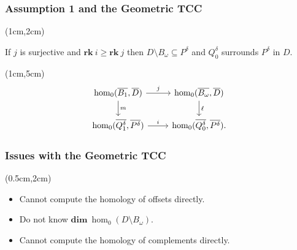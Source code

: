 \begin{frame}
  \frametitle{{\small Assumption 1 and the Geometric TCC}}

  \begin{textblock*}{11cm}(1cm,2cm)
    \begin{small}\begin{theorem}
        If $j$ is surjective and $\mathbf{rk}~i\geq \mathbf{rk}~j$ then $D\setminus B_\omega\subseteq P^\delta$ and $Q_0^\delta$ surrounds $P^\delta$ in $D$.
    \end{theorem}\end{small}
  \end{textblock*}

  \begin{textblock*}{11cm}(1cm,5cm)
    \[\begin{tikzcd}[ampersand replacement=\&]
      \hom_0(\overline{B_1},\overline{D})\arrow{d}{m} \arrow{r}{j} \&
      \hom_0(\overline{B_\omega}, \overline{D}) \arrow{d}{\ell} \\
      \hom_0(\overline{Q_1^\delta}, \overline{P^\delta}) \arrow{r}{i} \&
      \hom_0(\overline{Q_0^\delta}, \overline{P^\delta}).
    \end{tikzcd}\]
  \end{textblock*}
\end{frame}


\begin{frame}
  \frametitle{Issues with the Geometric TCC}

  \begin{textblock*}{12cm}(0.5cm,2cm)
    \begin{small}
      \begin{itemize}
        \item Cannot compute the homology of offsets directly.
        \item Do not know $\mathbf{dim}~\hom_0(D\setminus B_\omega)$.
        \item Cannot compute the homology of complements directly.
      \end{itemize}
    \end{small}
  \end{textblock*}

\end{frame}

